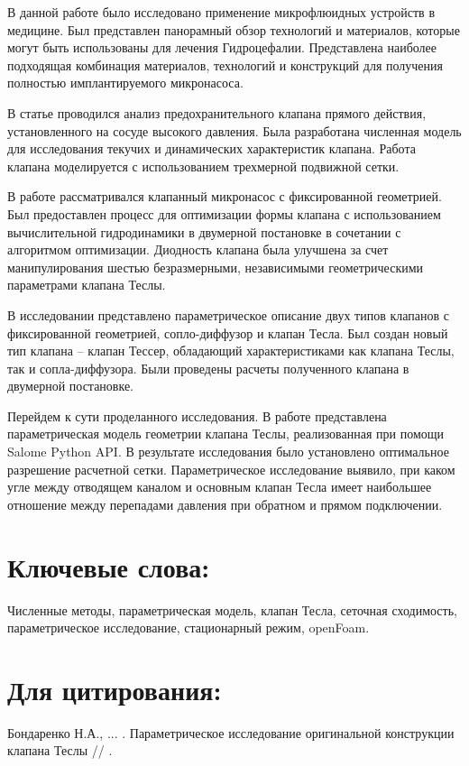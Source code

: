 \documentclass[14pt,a4paper]{article}
\begin{document}
        В данной работе \cite{article} было исследовано применение микрофлюидных устройств в медицине. Был представлен панорамный обзор технологий и материалов, которые могут быть использованы для лечения Гидроцефалии. Представлена наиболее подходящая комбинация материалов, технологий и конструкций для получения полностью имплантируемого микронасоса. 
        
        В статье \cite{SONG2014407} проводился анализ предохранительного клапана прямого действия, установленного на сосуде высокого давления. Была разработана численная модель для исследования текучих и динамических характеристик клапана. Работа клапана моделируется с использованием трехмерной подвижной сетки.
        
        В работе \cite{OptimizationOfTheFixed-GeometryValve} рассматривался клапанный микронасос с фиксированной геометрией. Был предоставлен процесс для оптимизации формы клапана с использованием вычислительной гидродинамики в двумерной постановке в сочетании с алгоритмом оптимизации. Диодность клапана была улучшена за счет манипулирования шестью безразмерными, независимыми геометрическими параметрами клапана Теслы.
        
        В исследовании \cite{inproceedings} представлено параметрическое описание двух типов клапанов с фиксированной геометрией, сопло-диффузор и клапан Тесла. Был создан новый тип клапана -- клапан Тессер, обладающий характеристиками как клапана Теслы, так и сопла-диффузора. Были проведены расчеты полученного клапана в двумерной постановке. 
        
        Перейдем к сути проделанного исследования. В работе представлена параметрическая модель геометрии клапана Теслы, реализованная при помощи Salome Python API. В результате исследования было установлено оптимальное разрешение расчетной сетки. Параметрическое исследование выявило, при каком угле между отводящем каналом и основным клапан Тесла имеет наибольшее отношение между перепадами давления при обратном и прямом подключении.   
                       
        \section*{Ключевые слова:}
        Численные методы, параметрическая модель, клапан Тесла, сеточная сходимость, параметрическое исследование, стационарный режим, openFoam.
        
        \section*{Для цитирования:}
        Бондаренко Н.А., ... . Параметрическое исследование оригинальной конструкции клапана Теслы // .
           
\end{document}
